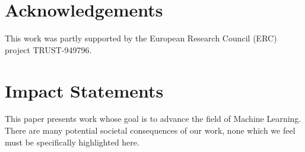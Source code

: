 \documentclass{article}
\theoremstyle{plain}
\begin{document}
\section*{Acknowledgements}
This work was partly supported by the European Research Council (ERC) project TRUST-949796.

\section{Impact Statements}
This paper presents work whose goal is to advance the field of Machine Learning. There are many potential societal consequences of our work, none which we feel must be specifically highlighted here.







\newpage
\appendix
\onecolumn
\end{document}
